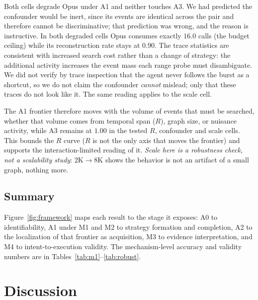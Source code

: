 \documentclass[sigconf,anonymous,review]{acmart}
\begin{document}
Both cells degrade Opus under A1 and neither touches A3. We had predicted the confounder would be
inert, since its events are identical across the pair and therefore cannot be discriminative; that
prediction was wrong, and the reason is instructive. In both degraded cells Opus consumes exactly
$16.0$ calls (the budget ceiling) while its reconstruction rate stays at $0.90$. The
trace statistics are consistent with increased search cost rather than a change of strategy: the
additional activity increases the event mass each range probe must disambiguate. We did not verify
by trace inspection that the agent never follows the burst as a shortcut, so we do not claim the
confounder \emph{cannot} mislead; only that these traces do not look like it. The same reading
applies to the scale cell.

The A1 frontier therefore moves with the volume of events that must be searched, whether that
volume comes from temporal span ($R$), graph size, or nuisance activity, while A3 remains at $1.00$
in the tested $R$, confounder and scale cells. This bounds the $R$ curve ($R$ is not the only axis that moves the frontier) and
supports the interaction-limited reading of it. \emph{Scale here is a robustness check, not a
scalability study}: $2\text{K}\to8\text{K}$ shows the behavior is not an artifact of a small
graph, nothing more.

\subsection{Summary}
Figure~\ref{fig:framework} maps each result to the stage it exposes: A0 to identifiability, A1
under M1 and M2 to strategy formation and completion, A2 to the localization of that frontier as
acquisition, M3 to evidence interpretation, and M4 to intent-to-execution validity. The
mechanism-level accuracy and validity numbers are in Tables~\ref{tab:m1}--\ref{tab:robust}.

\section{Discussion}
\end{document}
